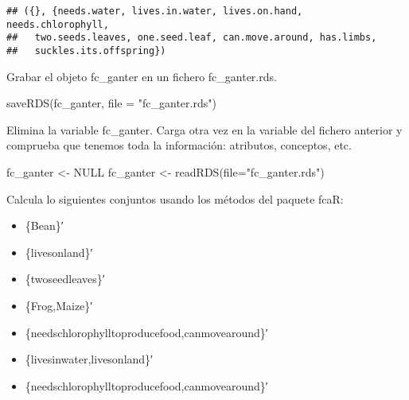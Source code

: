 \documentclass[
]{book}
\newenvironment{Shaded}{\begin{snugshade}}{\end{snugshade}}
\newcommand{\AttributeTok}[1]{\textcolor[rgb]{0.77,0.63,0.00}{#1}}
\newcommand{\ConstantTok}[1]{\textcolor[rgb]{0.00,0.00,0.00}{#1}}
\newcommand{\DecValTok}[1]{\textcolor[rgb]{0.00,0.00,0.81}{#1}}
\newcommand{\FunctionTok}[1]{\textcolor[rgb]{0.00,0.00,0.00}{#1}}
\newcommand{\NormalTok}[1]{#1}
\newcommand{\OtherTok}[1]{\textcolor[rgb]{0.56,0.35,0.01}{#1}}
\newcommand{\SpecialCharTok}[1]{\textcolor[rgb]{0.00,0.00,0.00}{#1}}
\newcommand{\StringTok}[1]{\textcolor[rgb]{0.31,0.60,0.02}{#1}}
\providecommand{\tightlist}{%
  \setlength{\itemsep}{0pt}\setlength{\parskip}{0pt}}
\begin{document}
\begin{verbatim}
## ({}, {needs.water, lives.in.water, lives.on.hand, needs.chlorophyll,
##   two.seeds.leaves, one.seed.leaf, can.move.around, has.limbs,
##   suckles.its.offspring})
\end{verbatim}

Grabar el objeto fc\_ganter en un fichero fc\_ganter.rds.

\begin{Shaded}
\begin{Highlighting}[]
\FunctionTok{saveRDS}\NormalTok{(fc\_ganter, }\AttributeTok{file =} \StringTok{"fc\_ganter.rds"}\NormalTok{)}
\end{Highlighting}
\end{Shaded}

Elimina la variable fc\_ganter. Carga otra vez en la variable del fichero anterior y comprueba que tenemos toda la información: atributos, conceptos, etc.

\begin{Shaded}
\begin{Highlighting}[]
\NormalTok{fc\_ganter }\OtherTok{\textless{}{-}} \ConstantTok{NULL}
\NormalTok{fc\_ganter }\OtherTok{\textless{}{-}} \FunctionTok{readRDS}\NormalTok{(}\AttributeTok{file=}\StringTok{"fc\_ganter.rds"}\NormalTok{)}
\end{Highlighting}
\end{Shaded}

Calcula lo siguientes conjuntos usando los métodos del paquete fcaR:

\begin{itemize}
\tightlist
\item
  \{Bean\}′
\item
  \{livesonland\}′
\item
  \{twoseedleaves\}′
\item
  \{Frog,Maize\}′
\item
  \{needschlorophylltoproducefood,canmovearound\}′
\item
  \{livesinwater,livesonland\}′
\item
  \{needschlorophylltoproducefood,canmovearound\}′
\end{itemize}

\begin{Shaded}
\end{Shaded}
\end{document}
